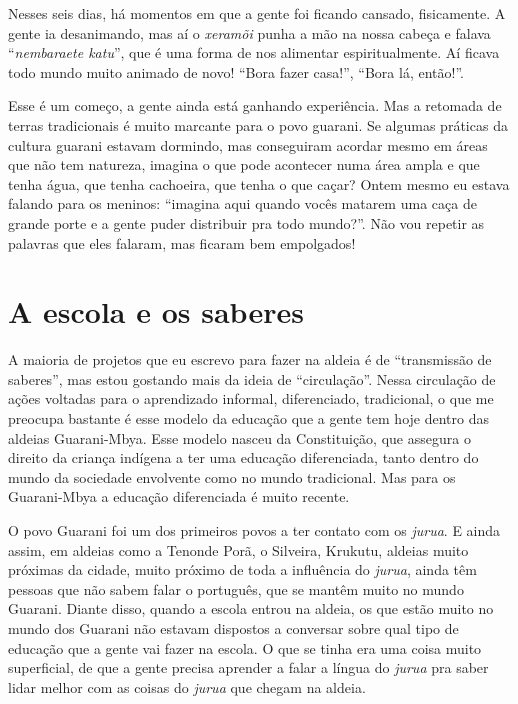 Nesses seis dias, há momentos em que a gente foi ficando cansado,
fisicamente. A gente ia desanimando, mas aí o \emph{xeramõi} punha a mão na
nossa cabeça e falava ``\emph{nembaraete katu}'', que é uma forma de nos
alimentar espiritualmente. Aí ficava todo mundo muito animado de novo!
``Bora fazer casa!'', ``Bora lá, então!''. 

Esse é um começo, a gente ainda está ganhando experiência. Mas a
retomada de terras tradicionais é muito marcante para o povo guarani.
Se algumas práticas da cultura guarani estavam dormindo, mas
conseguiram acordar mesmo em áreas que não tem natureza, imagina o que
pode acontecer numa área ampla e que tenha água, que tenha cachoeira,
que tenha o que caçar? Ontem mesmo eu estava falando para os meninos:
``imagina aqui quando vocês matarem uma caça de grande porte e a gente
puder distribuir pra todo mundo?''. Não vou repetir as palavras que eles
falaram, mas ficaram bem empolgados!

\section{A escola e os saberes}

A maioria de projetos que eu escrevo para fazer na aldeia é de
``transmissão de saberes'', mas estou gostando mais da ideia de
``circulação''. Nessa circulação de ações voltadas para o aprendizado
informal, diferenciado, tradicional, o que me preocupa bastante é esse
modelo da educação que a gente tem hoje dentro das aldeias
Guarani-Mbya. Esse modelo nasceu da Constituição, que assegura o
direito da criança indígena a ter uma educação diferenciada, tanto
dentro do mundo da sociedade envolvente como no mundo tradicional. Mas
para os Guarani-Mbya a educação diferenciada é muito recente.

O povo Guarani foi um dos primeiros povos a ter contato com os \emph{jurua}. E
ainda assim, em aldeias como a Tenonde Porã, o Silveira, Krukutu,
aldeias muito próximas da cidade, muito próximo de toda a influência do
\emph{jurua}, ainda têm pessoas que não sabem falar o português, que se mantêm
muito no mundo Guarani. Diante disso, quando a escola entrou na aldeia,
os que estão muito no mundo dos Guarani não estavam dispostos a
conversar sobre qual tipo de educação que a gente vai fazer na escola.
O que se tinha era uma coisa muito superficial, de que a gente precisa
aprender a falar a língua do \emph{jurua} pra saber lidar melhor com as coisas
do \emph{jurua} que chegam na aldeia. 

